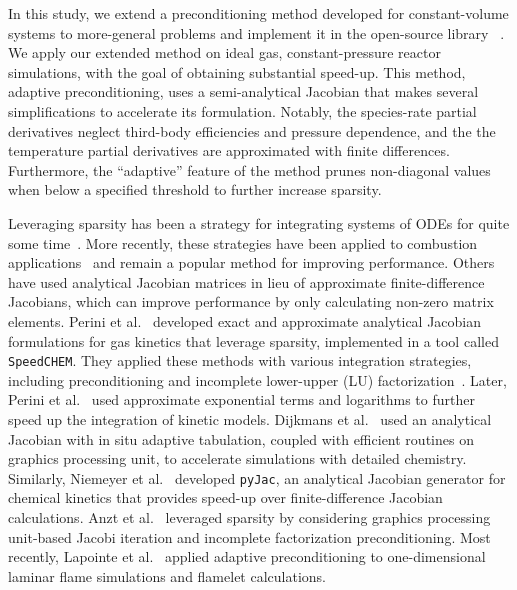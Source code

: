 \documentclass[twocolumn,10pt]{article} %
\begin{document}
In this study, we extend a preconditioning method developed for constant-volume systems \cite{mcnenly_faster_2015} to more-general problems and implement it in the open-source library \cantera{}~\cite{cantera}.
We apply our extended method on ideal gas, constant-pressure reactor simulations, with the goal of obtaining substantial speed-up.
This method, adaptive preconditioning, uses a semi-analytical Jacobian that makes several simplifications to accelerate its formulation.
Notably, the species-rate partial derivatives neglect third-body efficiencies and pressure dependence, and the
the temperature partial derivatives are approximated with finite differences.
Furthermore, the ``adaptive'' feature of the method prunes non-diagonal values when below a specified threshold to further increase sparsity.

Leveraging sparsity has been a strategy for integrating systems of ODEs for quite some time~\cite{brown_reduced_1989, saad_ilut_1994}.
More recently, these strategies have been applied to combustion applications~\cite{marzouk_embedding_2012} and remain a popular method for improving performance.
Others have used analytical Jacobian matrices in lieu of approximate finite-difference Jacobians, which can improve performance by only calculating non-zero matrix elements.
Perini et al.~\cite{perini_analytical_2012} developed exact and approximate analytical Jacobian formulations for gas kinetics that leverage sparsity, implemented in a tool called \texttt{SpeedCHEM}.
They applied these methods with various integration strategies, including preconditioning and incomplete lower-upper (LU) factorization~\cite{perini_study_2014}.
Later, Perini et al.~\cite{perini_fast_2018} used approximate exponential terms and logarithms to further speed up the integration of kinetic models.
Dijkmans et al.~\cite{dijkmans_gpu_2014} used an analytical Jacobian with in situ adaptive tabulation, coupled with efficient routines on graphics processing unit, to accelerate simulations with detailed chemistry.
Similarly, Niemeyer et al.~\cite{niemeyer_pyjac_2017} developed \texttt{pyJac}, an analytical Jacobian generator for chemical kinetics that provides speed-up over finite-difference Jacobian calculations.
Anzt et al.~\cite{anzt_preconditioned_2017} leveraged sparsity by considering graphics processing unit-based Jacobi iteration and incomplete factorization preconditioning.
Most recently, Lapointe et al.~\cite{lapointe_sparse_2019, lapointe_computationally-efficient_2020} applied adaptive preconditioning to one-dimensional laminar flame simulations and flamelet calculations.
\end{document}

